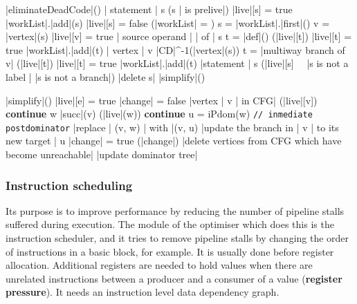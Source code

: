 \documentclass[a4paper,12pt, notitlepage]{article}
\begin{document}
\begin{program}
\PROC |eliminateDeadCode|() \BODY
    \FOREACH | statement | s \DO
        \IF (s | is prelive|) \AR*
            |live|[s] = true
            |workList|.|add|(s)
        \ELSE
            |live|[s] = false
        \FI
    \OD
    \WHILE (|workList| \not= \emptyset) \DO
        s = |workList|.|first|()
        v = |vertex|(s)
        |live|[v] = true
        \FOREACH | source operand | \omega | of | s \DO
            t = |def|(\omega)
            \IF (\neg |live|[t]) \AR*
                |live|[t] = true
                |workList|.|add|(t)
            \FI
        \OD
        \FOREACH | vertex | v \in |CD|^{-1}(|vertex|(s)) \DO
            t = |multiway branch of v|
            \IF (\neg |live|[t]) \AR*
                |live|[t] = true
                |workList|.|add|(t)
            \FI
        \OD
    \OD
    \FOREACH |statement | s \DO
        \IF (\neg|live|[s] \ \land \ |s is not a label | \land |s is not a branch|) \AR*
            |delete s|
        \FI
    \OD
    |simplify|()
\end{program}
\pagebreak
\begin{program}
\PROC |simplify|() \BODY
    |live|[e] = true
    |change| = false
    \FOREACH |vertex | v | in CFG| \DO
        \IF (\neg |live|[v]) \AR*
            \textbf{continue}
        \FI
        \FOREACH w \in |succ|(v) \DO
            \IF (|live|(w)) \AR*
                \textbf{continue}
            \FI
            u = iPdom(w) \texttt{// inmediate postdominator}
            |replace | (v, w) | with |(v, u)
            |update the branch in | v | to its new target | u
            |change| = true
        \OD
    \OD
    \IF (|change|) \AR*
        |delete vertices from CFG which have become unreachable|
        |update dominator tree|
    \FI
\end{program}

\subsubsection*{Instruction scheduling}
Its purpose is to improve performance by reducing the number of pipeline stalls
suffered during execution. The module of the optimiser which does this is the
instruction scheduler, and it tries to remove pipeline stalls by changing the
order of instructions in a basic block, for example.
It is usually done before register allocation. Additional registers are needed
to hold values when there are unrelated instructions between a producer and a
consumer of a value (\textbf{register pressure}). 
It needs an instruction level data dependency graph.
\end{document}

